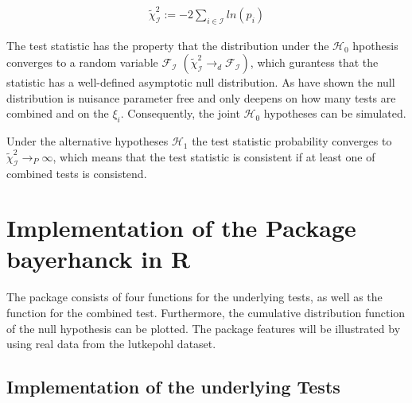 \documentclass[11pt,a4paper]{article}
\begin{document}
\begin{align}
  \label{eq:bayer-hanck}
  \tilde{\chi}_{\mathcal{I}}^{2} := -2 \sum_{i \in \mathcal{I}} ln(p_i) 
\end{align}

The test statistic has the property that the distribution under the
\(\mathcal{H}_0\) hpothesis converges to a random variable
\(\mathcal{F}_{\mathcal{I}}\)
\(\left(\tilde{\chi}_{\mathcal{I}}^{2} \rightarrow_{d} \mathcal{F}_{\mathcal{I}} \right)\),
which gurantess that the statistic has a well-defined asymptotic null
distribution. As \textcite{Bayerhanck2009} have shown the null
distribution is nuisance parameter free and only deepens on how many
tests are combined and on the \(\xi_i\). Consequently, the joint
\(\mathcal{H_0}\) hypotheses can be simulated.

Under the alternative hypotheses \(\mathcal{H}_1\) the test statistic
probability converges to
\(\tilde{\chi}_{\mathcal{I}}^{2} \rightarrow_P \infty\), which means
that the test statistic is consistent if at least one of combined tests
is consistend.

\hypertarget{implementation-of-the-package-bayerhanck-in-r}{%
\section{\texorpdfstring{Implementation of the Package
\textbf{bayerhanck} in
R}{Implementation of the Package bayerhanck in R}}\label{implementation-of-the-package-bayerhanck-in-r}}

The package consists of four functions for the underlying tests, as well
as the function for the combined test. Furthermore, the cumulative
distribution function of the null hypothesis can be plotted. The package
features will be illustrated by using real data from the lutkepohl
dataset.

\hypertarget{implementation-of-the-underlying-tests}{%
\subsection{Implementation of the underlying
Tests}\label{implementation-of-the-underlying-tests}}
\end{document}
